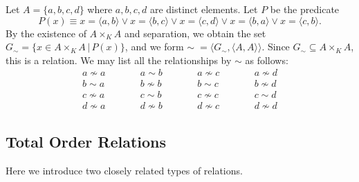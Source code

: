 \begin{example}\label{ch1ex_rel}
	Let $A = \{a, b, c, d\}$ where $a, b, c, d$ are distinct elements.
	Let $P$ be the predicate 
	\[ P(x)\equiv x = \langle a, b\rangle \lor x = \langle b, c\rangle \lor x = \langle c, d\rangle \lor x = \langle b, a\rangle \lor x = \langle c, b\rangle. \]
	By the existence of $A\times_{K} A$ and separation, we obtain the set $G_{\sim} = \{ x\in A\times_{K} A \,|\, P(x) \}$, and we form $\sim\; = \langle G_{\sim}, \langle A, A\rangle\rangle$.
	Since $G_{\sim}\subseteq A\times_{K} A$, this is a relation. 
	We may list all the relationships by $\sim$ as follows:
	\begin{align*}
		a \not\sim a &\qquad & a \sim b     &\qquad & a \not\sim c &\qquad & a \not\sim d \\[4pt]
		b \sim a     &\qquad & b \not\sim b &\qquad & b \sim c     &\qquad & b \not\sim d \\[4pt]
		c \not\sim a &\qquad & c \sim b     &\qquad & c \not\sim c &\qquad & c \sim d     \\[4pt]
		d \not\sim a &\qquad & d \not\sim b &\qquad & d \not\sim c     &\qquad & d \not\sim d
	\end{align*}
\end{example}

\subsection{Total Order Relations}

Here we introduce two closely related types of relations. 

